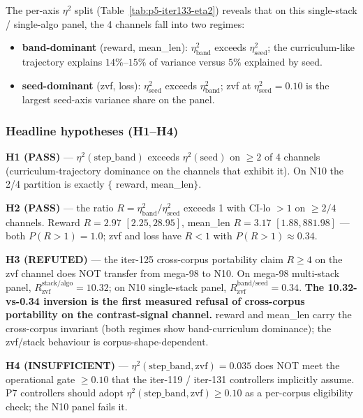 The per-axis $\eta^2$ split (Table~\ref{tab:p5-iter133-eta2}) reveals that
on this single-stack / single-algo panel, the 4 channels fall into two
regimes:
\begin{itemize}
\item \textbf{band-dominant} (reward, mean\_len): $\eta^2_{\mathrm{band}}$
  exceeds $\eta^2_{\mathrm{seed}}$; the curriculum-like trajectory explains
  $14\%$--$15\%$ of variance versus $5\%$ explained by seed.
\item \textbf{seed-dominant} (zvf, loss): $\eta^2_{\mathrm{seed}}$ exceeds
  $\eta^2_{\mathrm{band}}$; zvf at $\eta^2_{\mathrm{seed}}=0.10$ is the
  largest seed-axis variance share on the panel.
\end{itemize}

\subsubsection{Headline hypotheses (H1--H4)}
\label{sec:p5-iter133-headlines}
\textbf{H1 (PASS)} --- $\eta^2(\mathrm{step\_band})$ exceeds $\eta^2(\mathrm{seed})$
on $\geq 2$ of 4 channels (curriculum-trajectory dominance on the channels
that exhibit it). On N10 the 2/4 partition is exactly $\{$
reward, mean\_len$\}$.

\textbf{H2 (PASS)} --- the ratio $R = \eta^2_{\mathrm{band}} / \eta^2_{\mathrm{seed}}$
exceeds 1 with CI-lo $>1$ on $\geq 2/4$ channels. Reward $R=2.97$
$[2.25, 28.95]$, mean\_len $R=3.17$ $[1.88, 881.98]$ --- both
$P(R>1)=1.0$; zvf and loss have $R<1$ with $P(R>1)\approx 0.34$.

\begin{sloppypar}
\textbf{H3 (REFUTED)} --- the iter-125 cross-corpus portability claim
$R \geq 4$ on the zvf channel does NOT transfer from mega-98 to N10.
On mega-98 multi-stack panel, $R_{\mathrm{zvf}}^{\mathrm{stack/algo}}=10.32$;
on N10 single-stack panel, $R_{\mathrm{zvf}}^{\mathrm{band/seed}}=0.34$.
\textbf{The 10.32-vs-0.34 inversion is the first measured refusal of
cross-corpus portability on the contrast-signal channel.} reward and
mean\_len carry the cross-corpus invariant (both regimes show band-curriculum
dominance); the zvf/stack behaviour is corpus-shape-dependent.
\end{sloppypar}

\textbf{H4 (INSUFFICIENT)} --- $\eta^2(\mathrm{step\_band}, \mathrm{zvf}) = 0.035$
does NOT meet the operational gate $\geq 0.10$ that the iter-119 / iter-131
controllers implicitly assume. P7 controllers should adopt
$\eta^2(\mathrm{step\_band}, \mathrm{zvf}) \geq 0.10$ as a per-corpus
eligibility check; the N10 panel fails it.

